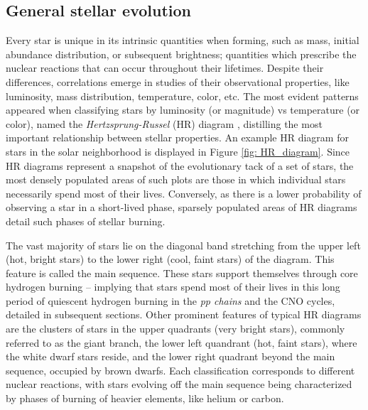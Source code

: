 \subsection{General stellar evolution}

Every star is unique in its intrinsic quantities when forming, such as mass, initial abundance distribution, or subsequent brightness; quantities which prescribe the nuclear reactions that can occur throughout their lifetimes. Despite their differences, correlations emerge in studies of their observational properties, like luminosity, mass distribution, temperature, color, etc. The most evident patterns appeared when classifying stars by luminosity (or magnitude) vs temperature (or color), named the \textit{Hertzsprung-Russel} (HR) diagram \cite{CarrollOstlieBook, IliadisBook, RyanNortonBook}, distilling the most important relationship between stellar properties. An example HR diagram for stars in the solar neighborhood is displayed in Figure \ref{fig: HR_diagram}. Since HR diagrams represent a snapshot of the evolutionary tack of a set of stars, the most densely populated areas of such plots are those in which individual stars necessarily spend most of their lives. Conversely, as there is a lower probability of observing a star in a short-lived phase, sparsely populated areas of HR diagrams detail such phases of stellar burning. 

The vast majority of stars lie on the diagonal band stretching from the upper left (hot, bright stars) to the lower right (cool, faint stars) of the diagram. This feature is called the main sequence. These stars support themselves through core hydrogen burning -- implying that stars spend most of their lives in this long period of quiescent hydrogen burning in the \textit{pp chains} and the CNO cycles, detailed in subsequent sections. Other prominent features of typical HR diagrams are the clusters of stars in the upper quadrants (very bright stars), commonly referred to as the giant branch, the lower left quandrant (hot, faint stars), where the white dwarf stars reside, and the lower right quadrant beyond the main sequence, occupied by brown dwarfs. Each classification corresponds to different nuclear reactions, with stars evolving off the main sequence being characterized by phases of burning of heavier elements, like helium or carbon. 

